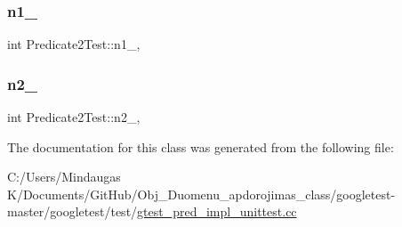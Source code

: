 \mbox{\label{class_predicate2_test_ac002d8e279b24e75906fd19973fc2170}} 
\subsubsection{\texorpdfstring{n1\_}{n1\_}}
{\footnotesize\ttfamily int Predicate2\+Test\+::n1\+\_\+\hspace{0.3cm}{\ttfamily [static]}, {\ttfamily [protected]}}

\mbox{\label{class_predicate2_test_a9dbe5173570b9b911af2df889c287027}} 
\subsubsection{\texorpdfstring{n2\_}{n2\_}}
{\footnotesize\ttfamily int Predicate2\+Test\+::n2\+\_\+\hspace{0.3cm}{\ttfamily [static]}, {\ttfamily [protected]}}



The documentation for this class was generated from the following file\+:\begin{DoxyCompactItemize}
\item 
C\+:/\+Users/\+Mindaugas K/\+Documents/\+Git\+Hub/\+Obj\+\_\+\+Duomenu\+\_\+apdorojimas\+\_\+class/googletest-\/master/googletest/test/\mbox{\hyperlink{googletest-master_2googletest_2test_2gtest__pred__impl__unittest_8cc}{gtest\+\_\+pred\+\_\+impl\+\_\+unittest.\+cc}}\end{DoxyCompactItemize}
